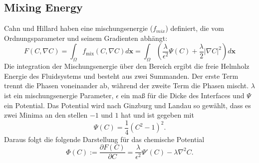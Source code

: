 \subsection{Mixing Energy}
Cahn und Hillard haben eine mischungsenergie ($f_{mix}$) definiert, die vom Ordnungsparameter und seinem Gradienten abhängt:
\begin{equation}
    F(C, \nabla C) = \int_{\Omega} f_{\mathrm{mix}} (C, \nabla C) d\textbf{x} = \int_{\Omega}\left(\frac{\lambda}{\epsilon^2}\Psi(C)+\frac{\lambda}{2}\vert\nabla C\vert^2\right)d\textbf{x}
\end{equation}
Die integration der Mischungsenergie über den Bereich ergibt die freie Helmholz Energie des Fluidsystems und besteht aus zwei Summanden. Der erste Term trennt die Phasen voneinander ab, während der zweite Term die Phasen mischt. $\lambda$ ist ein mischungsenergie Parameter, $\epsilon$ ein maß für die Dicke des Interfaces und $\Psi$ ein Potential. Das Potential wird nach Ginzburg und Landau so gewählt, dass es zwei Minima an den stellen $-1$ und $1$ hat und ist gegeben mit 
\begin{equation}
    \Psi(C)= \frac{1}{4}\left(C^2-1\right)^2.
\end{equation}
Daraus folgt die folgende Darstellung für das chemische Potential 
\begin{equation}
    \label{eq: chempotentialMIXING_pahseFieldMethod}
    \Phi(C):= \frac{\partial F(C)}{\partial C} = \frac{\lambda}{\epsilon^2}\Psi'(C)-\lambda\nabla^2C.
\end{equation}


